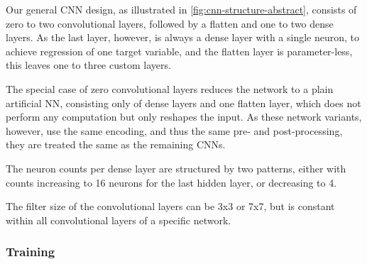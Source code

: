Our general \gls{CNN} design, as illustrated in \ref{fig:cnn-structure-abstract}, consists of zero to two convolutional layers, followed by a flatten and one to two dense layers. As the last layer, however, is always a dense layer with a single neuron, to achieve regression of one target variable, and the flatten layer is parameter-less, this leaves one to three custom layers. 

The special case of zero convolutional layers reduces the network to a plain artificial \gls{NN}, consisting only of dense layers and one flatten layer, which does not perform any computation but only reshapes the input. As these network variants, however, use the same encoding, and thus the same pre- and post-processing, they are treated the same as the remaining \glspl{CNN}.

The neuron counts per dense layer are structured by two patterns, either with counts increasing to 16 neurons for the last hidden layer, or decreasing to 4.

The filter size of the convolutional layers can be 3x3 or 7x7, but is constant within all convolutional layers of a specific network.

\subsubsection{Training}

